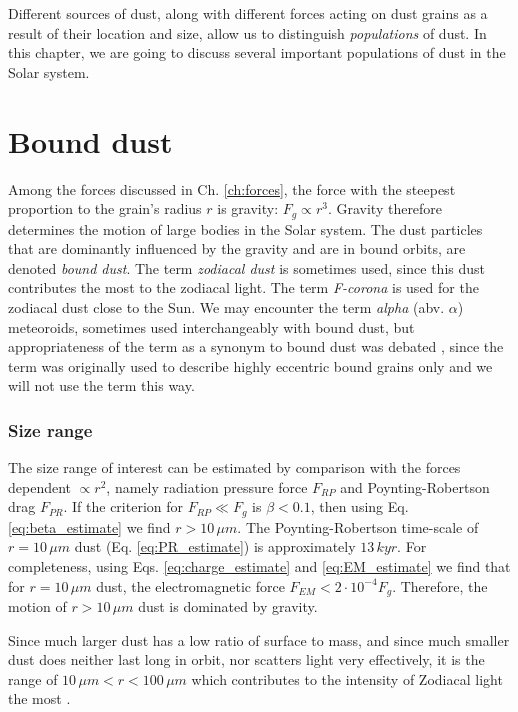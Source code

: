 Different sources of dust, along with different forces acting on dust grains as a result of their location and size, allow us to distinguish \textit{populations} of dust. In this chapter, we are going to discuss several important populations of dust in the Solar system.

\section{Bound dust}

Among the forces discussed in Ch. \ref{ch:forces}, the force with the steepest proportion to the grain's radius $r$ is gravity: $F_g \propto r^3$. Gravity therefore determines the motion of large bodies in the Solar system. The dust particles that are dominantly influenced by the gravity and are in bound orbits, are denoted \textit{bound dust}. The term \textit{zodiacal dust} is sometimes used, since this dust contributes the most to the zodiacal light. The term \textit{F-corona} is used for the zodiacal dust close to the Sun. We may encounter the term \textit{alpha} (abv. $\alpha$) meteoroids, sometimes used interchangeably with bound dust, but appropriateness of the term as a synonym to bound dust was debated \citep{sommer2023alpha}, since the term was originally used to describe highly eccentric bound grains only \citep{zook1975source} and we will not use the term this way.

\subsubsection{Size range}

The size range of interest can be estimated by comparison with the forces dependent $\propto r^2$, namely radiation pressure force $F_{RP}$ and Poynting-Robertson drag $F_{PR}$. If the criterion for $F_{RP} \ll F_g$ is $\beta<0.1$, then using Eq. \ref{eq:beta_estimate} we find $r>10 \, \si{\mu m}$. The Poynting-Robertson time-scale of $r=10 \, \si{\mu m}$ dust (Eq. \ref{eq:PR_estimate}) is approximately $13 \, \si{kyr}$. For completeness, using Eqs. \ref{eq:charge_estimate} and \ref{eq:EM_estimate} we find that for $r=10 \, \si{\mu m}$ dust, the electromagnetic force $F_{EM} < 2\cdot 10^{-4} F_g$. Therefore, the motion of $r>10 \, \si{\mu m}$ dust is dominated by gravity.

Since much larger dust has a low ratio of surface to mass, and since much smaller dust does neither last long in orbit, nor scatters light very effectively, it is the range of $10 \, \si{\mu m} < r < 100 \, \si{\mu m}$ which contributes to the intensity of Zodiacal light the most \citep{leinert1981zodiacal}. 

